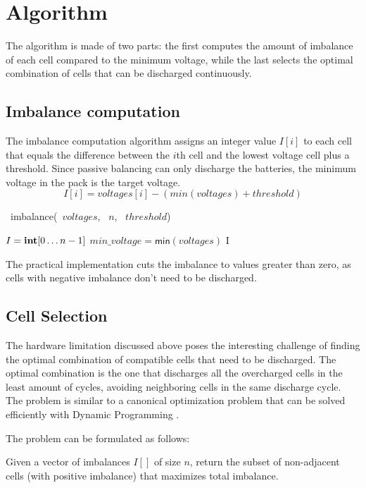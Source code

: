 \section{Algorithm}

The algorithm is made of two parts: the first computes the amount of imbalance of each cell compared to the minimum voltage, while the last selects the optimal combination of cells that can be discharged continuously.

\subsection{Imbalance computation}

The imbalance computation algorithm assigns an integer value $I[i]$ to each cell that equals the difference between the $i$th cell and the lowest voltage cell plus a threshold. Since passive balancing can only discharge the batteries, the minimum voltage in the pack is the target voltage.
\[
    I[i] = voltages[i] - (min(voltages) + threshold)
\]

\begin{algorithm}[H]
    \DontPrintSemicolon
    \NoCaptionOfAlgo
    \caption[imbalance]{\INTARRAY\ \textsf{imbalance}(\INTARRAY\ $voltages$, \INTEGER\ $n$, \INTEGER\ $threshold$)}\label{algorithm:imbalance}

    $I = \INTEGER[0 \ldots n-1]$\;
    $min\_voltage=\textsf{min}(voltages)$\;
    \Return I\;
\end{algorithm}
The practical implementation cuts the imbalance to values greater than zero, as cells with negative imbalance don't need to be discharged.

\subsection{Cell Selection}
The hardware limitation discussed above poses the interesting challenge of finding the optimal combination of compatible cells that need to be discharged. The optimal combination is the one that discharges all the overcharged cells in the least amount of cycles, avoiding neighboring cells in the same discharge cycle. The problem is similar to a canonical optimization problem that can be solved efficiently with Dynamic Programming \cite{montresor}.

The problem can be formulated as follows:

Given a vector of imbalances $I[]$ of size $n$, return the subset of non-adjacent cells (with positive imbalance) that maximizes total imbalance.

